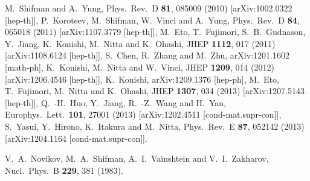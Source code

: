 \documentclass[12pt]{article}
\begin{document}
\begin{thebibliography}{99}
  M.~Shifman and A.~Yung,
  Phys.\ Rev.\ D {\bf 81}, 085009 (2010)
  [arXiv:1002.0322 [hep-th]],
  P.~Koroteev, M.~Shifman, W.~Vinci and A.~Yung,
  Phys.\ Rev.\ D {\bf 84}, 065018 (2011)
  [arXiv:1107.3779 [hep-th]],
%
  M.~Eto, T.~Fujimori, S.~B.~Gudnason, Y.~Jiang, K.~Konishi, M.~Nitta and K.~Ohashi,
  JHEP {\bf 1112}, 017 (2011)
  [arXiv:1108.6124 [hep-th]],
%
  S.~Chen, R.~Zhang and M.~Zhu,
  arXiv:1201.1602 [math-ph],
%
  K.~Konishi, M.~Nitta and W.~Vinci,
  JHEP {\bf 1209}, 014 (2012)
  [arXiv:1206.4546 [hep-th]],
%
  K.~Konishi,
  arXiv:1209.1376 [hep-ph],
%
  M.~Eto, T.~Fujimori, M.~Nitta and K.~Ohashi,
  JHEP {\bf 1307}, 034 (2013)
  [arXiv:1207.5143 [hep-th]],
%
  Q.~-H.~Huo, Y.~Jiang, R.~-Z.~Wang and H.~Yan,
  Europhys.\ Lett.\  {\bf 101}, 27001 (2013)
  [arXiv:1202.4511 [cond-mat.supr-con]],
%
  S.~Yasui, Y.~Hirono, K.~Itakura and M.~Nitta,
  Phys.\ Rev.\ E {\bf 87}, 052142 (2013)
  [arXiv:1204.1164 [cond-mat.supr-con]].

  V.~A.~Novikov, M.~A.~Shifman, A.~I.~Vainshtein and V.~I.~Zakharov,
  Nucl.\ Phys.\ B {\bf 229}, 381 (1983).


\end{thebibliography}
\end{document}
